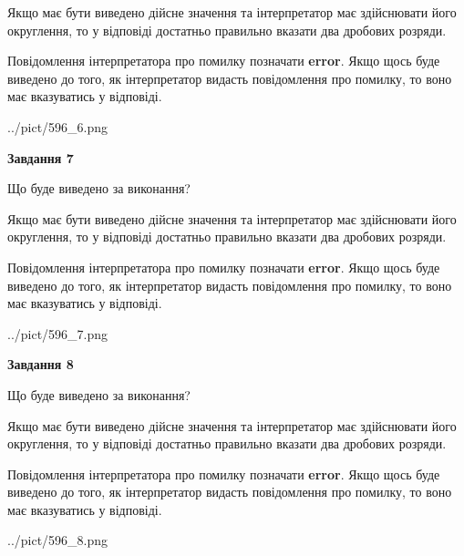 \documentclass[12pt, ukrainian]{article}
\begin{document}
{\begin {Large}
Якщо має бути виведено дійсне значення та інтерпретатор має здійснювати його округлення, 
то у відповіді достатньо правильно вказати два дробових розряди.

Повідомлення інтерпретатора про помилку позначати \textbf{error}.
Якщо щось буде виведено до того, як інтерпретатор видасть повідомлення про помилку, 
то воно має вказуватись у відповіді. \par

\begin{center}
	{../pict/596_6.png}
\end{center}
\newpage

{\begin {center}\textbf{Завдання 7}\end {center}}\par
Що буде виведено за виконання? \par

Якщо має бути виведено дійсне значення та інтерпретатор має здійснювати його округлення, 
то у відповіді достатньо правильно вказати два дробових розряди.

Повідомлення інтерпретатора про помилку позначати \textbf{error}.
Якщо щось буде виведено до того, як інтерпретатор видасть повідомлення про помилку, 
то воно має вказуватись у відповіді. \par

\begin{center}
	{../pict/596_7.png}
\end{center}
\newpage

{\begin {center}\textbf{Завдання 8}\end {center}}\par
Що буде виведено за виконання? \par

Якщо має бути виведено дійсне значення та інтерпретатор має здійснювати його округлення, 
то у відповіді достатньо правильно вказати два дробових розряди.

Повідомлення інтерпретатора про помилку позначати \textbf{error}.
Якщо щось буде виведено до того, як інтерпретатор видасть повідомлення про помилку, 
то воно має вказуватись у відповіді. \par

\begin{center}
	{../pict/596_8.png}
\end{center}
\newpage


\end{Large}}
\end{document}
